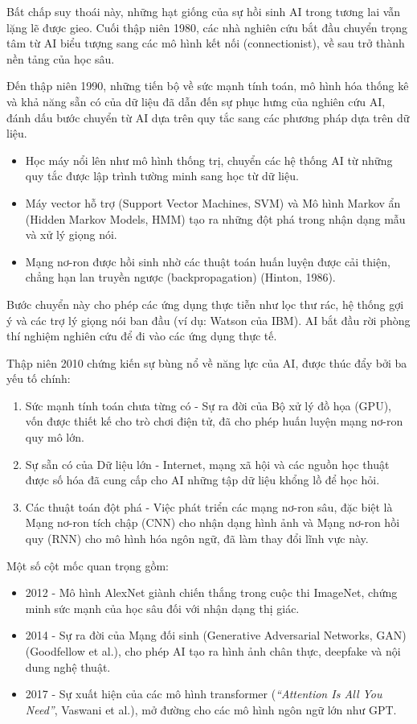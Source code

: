 Bất chấp suy thoái này, những hạt giống của sự hồi sinh AI trong tương lai vẫn lặng lẽ được gieo. Cuối thập niên 1980, các nhà nghiên cứu bắt đầu chuyển trọng tâm từ AI biểu tượng sang các mô hình kết nối (connectionist), về sau trở thành nền tảng của học sâu.

Đến thập niên 1990, những tiến bộ về sức mạnh tính toán, mô hình hóa thống kê và khả năng sẵn có của dữ liệu đã dẫn đến sự phục hưng của nghiên cứu AI, đánh dấu bước chuyển từ AI dựa trên quy tắc sang các phương pháp dựa trên dữ liệu.

\begin{itemize}
\item
  Học máy nổi lên như mô hình thống trị, chuyển các hệ thống AI từ những quy tắc được lập trình tường minh sang học từ dữ liệu.
\item
  Máy vector hỗ trợ (Support Vector Machines, SVM) và Mô hình Markov ẩn (Hidden Markov Models, HMM) tạo ra những đột phá trong nhận dạng mẫu và xử lý giọng nói.
\item
  Mạng nơ-ron được hồi sinh nhờ các thuật toán huấn luyện được cải thiện, chẳng hạn lan truyền ngược (backpropagation) (Hinton, 1986).
\end{itemize}

Bước chuyển này cho phép các ứng dụng thực tiễn như lọc thư rác, hệ thống gợi ý và các trợ lý giọng nói ban đầu (ví dụ: Watson của IBM). AI bắt đầu rời phòng thí nghiệm nghiên cứu để đi vào các ứng dụng thực tế.

Thập niên 2010 chứng kiến sự bùng nổ về năng lực của AI, được thúc đẩy bởi ba yếu tố chính:

\begin{enumerate}
\def\labelenumi{\arabic{enumi}.}
\item
  Sức mạnh tính toán chưa từng có - Sự ra đời của Bộ xử lý đồ họa (GPU), vốn được thiết kế cho trò chơi điện tử, đã cho phép huấn luyện mạng nơ-ron quy mô lớn.
\item
  Sự sẵn có của Dữ liệu lớn - Internet, mạng xã hội và các nguồn học thuật được số hóa đã cung cấp cho AI những tập dữ liệu khổng lồ để học hỏi.
\item
  Các thuật toán đột phá - Việc phát triển các mạng nơ-ron sâu, đặc biệt là Mạng nơ-ron tích chập (CNN) cho nhận dạng hình ảnh và Mạng nơ-ron hồi quy (RNN) cho mô hình hóa ngôn ngữ, đã làm thay đổi lĩnh vực này.
\end{enumerate}

Một số cột mốc quan trọng gồm:

\begin{itemize}
\item
  2012 - Mô hình AlexNet giành chiến thắng trong cuộc thi ImageNet, chứng minh sức mạnh của học sâu đối với nhận dạng thị giác.
\item
  2014 - Sự ra đời của Mạng đối sinh (Generative Adversarial Networks, GAN) (Goodfellow et al.), cho phép AI tạo ra hình ảnh chân thực, deepfake và nội dung nghệ thuật.
\item
  2017 - Sự xuất hiện của các mô hình transformer (\emph{``Attention Is All You Need''}, Vaswani et al.), mở đường cho các mô hình ngôn ngữ lớn như GPT.
\end{itemize}

